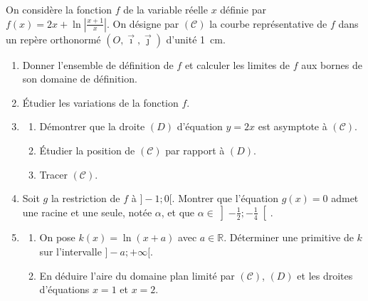 \begin{exo}
\label{exo:el 2x ln abs}
      On consid\`ere la fonction $f$ de la variable r\'eelle $x$ d\'efinie par $f(x) = 2 x + \ln \left| \frac{x + 1}{x} \right|$.
      On d\'esigne par $(\mathcal{C})$ la courbe repr\'esentative de $f$ dans un rep\`ere orthonorm\'e $(O,\vec{\imath}, \vec{\jmath})$ d'unit\'e 1~cm.
      \begin{enumerate}
      \item Donner l'ensemble de d\'efinition de $f$ et calculer les limites de $f$ aux bornes de son domaine de d\'efinition.
      \item \'Etudier les variations de la fonction $f$.
      \item
            \begin{enumerate}
            \item D\'emontrer que la droite $(D)$ d'\'equation $y = 2x$ est asymptote \`a $(\mathcal{C})$.
            \item \'Etudier la position de $(\mathcal{C})$ par rapport \`a $(D)$.
            \item Tracer $(\mathcal{C})$.
            \end{enumerate}
      \item Soit $g$ la restriction de $f$ \`a $]-1 ; 0[$. Montrer que l'\'equation $g(x) = 0$ admet une racine et une seule,
            not\'ee $\alpha$, et que $\alpha \in \left]-\frac{1}{2} ; -\frac{1}{4}\right[$.
      \item
           \begin{enumerate}
           \item On pose $k(x) = \ln (x + a)$ avec $a \in \mathbb{R}$.
                 D\'eterminer une primitive de $k$ sur l'intervalle $]-a ; + \infty[$.
           \item En d\'eduire l'aire du domaine plan limit\'e par $(\mathcal{C})$, $(D)$ et les droites d'\'equations $x = 1$ et $x = 2$.
           \end{enumerate}
      \end{enumerate}
\end{exo}
